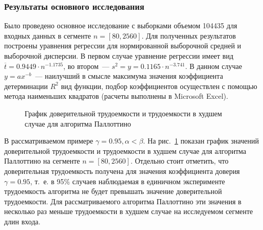\documentclass[a4paper, article, 12pt]{extarticle}
\begin{document}
\subsubsection{Результаты основного исследования}\label{subsec:results_part_2}

Было проведено основное исследование с выборками объемом 104435 для входных данных в сегменте $n = [80, 2560]$. Для полученных результатов построены уравнения регрессии для нормированной выборочной средней и выборочной дисперсии. В первом случае уравнение регрессии имеет вид $\overline{t} = 0.9449 \cdot n^{-1.1735}$, во втором~--- $s^2 = y = 0.1165 \cdot n^{-3.741}$. В данном случае $y = ax^{-b}$~--- наилучший в смысле максимума значения коэффициента детерминации $R^2$ вид функции, подбор коэффициентов осуществлен с помощью метода наименьших квадратов (расчеты выполнены в Microsoft Excel).

\begin{figure}[h]
	\caption{График доверительной трудоемкости и трудоемкости в худшем случае для алгоритма Паллоттино}
	\label{fig:comparison_complexities}
\end{figure}

В рассматриваемом примере $\gamma = 0.95, \alpha < \beta$. На рис.~\ref{fig:comparison_complexities} показан график значений доверительной трудоемкости и трудоемкости в худшем случае для алгоритма Паллоттино на сегменте $n = [80, 2560]$. Отдельно стоит отметить, что доверительная трудоемкость получена для значения коэффициента доверия $\gamma = 0.95$, т.~е. в 95\% случаев наблюдаемая в единичном эксперименте трудоемкость алгоритма не будет превышать значение доверительной трудоемкости. Для рассматриваемого алгоритма Паллоттино эти значения в несколько раз меньше трудоемкости в худшем случае на исследуемом сегменте длин входа.
\end{document}
